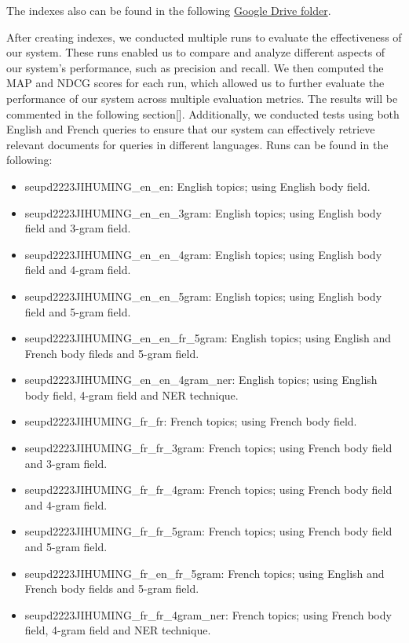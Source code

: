 The indexes also can be found in the following
\href{https://drive.google.com/drive/folders/1CK_kLeZ5Us3VJe8hiG1vhwPrDs94cLvU?usp=share_link}{Google Drive folder}.

After creating indexes, we conducted multiple runs to evaluate the effectiveness of our system. 
These runs enabled us to compare and analyze different aspects of our system's performance, such as precision and recall. 
We then computed the MAP and NDCG scores for each run, which allowed us to further evaluate the performance of our 
system across multiple evaluation metrics.
The results will be commented in the following section[].
Additionally, we conducted tests using both English and French queries to ensure that our system can effectively retrieve 
relevant documents for queries in different languages. 
Runs can be found in the following:
\begin{itemize}
	\item seupd2223\-JIHUMING\_en\_en: English topics; using English body field.
	\item seupd2223\-JIHUMING\_en\_en\_3gram: English topics; using English body field and 3-gram field.
	\item seupd2223\-JIHUMING\_en\_en\_4gram: English topics; using English body field and 4-gram field.
	\item seupd2223\-JIHUMING\_en\_en\_5gram: English topics; using English body field and 5-gram field.
	\item seupd2223\-JIHUMING\_en\_en\_fr\_5gram: English topics; using English and French body fileds and 5-gram field.
	\item seupd2223\-JIHUMING\_en\_en\_4gram\_ner: English topics; using English body field, 4-gram field and NER technique.
	\item seupd2223\-JIHUMING\_fr\_fr: French topics; using French body field.
	\item seupd2223\-JIHUMING\_fr\_fr\_3gram: French topics; using French body field and 3-gram field.
	\item seupd2223\-JIHUMING\_fr\_fr\_4gram: French topics; using French body field and 4-gram field.
	\item seupd2223\-JIHUMING\_fr\_fr\_5gram: French topics; using French body field and 5-gram field.
	\item seupd2223\-JIHUMING\_fr\_en\_fr\_5gram: French topics; using English and French body fields and 5-gram field.
	\item seupd2223\-JIHUMING\_fr\_fr\_4gram\_ner: French topics; using French body field, 4-gram field and NER technique.
	
\end{itemize}